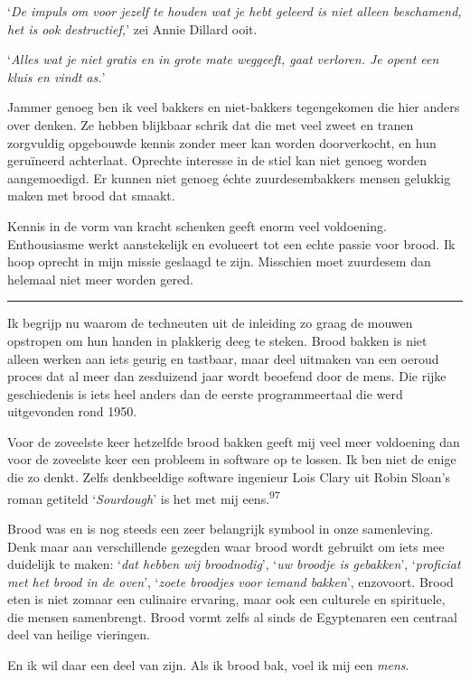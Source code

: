 \documentclass[
  11pt,
  dutch,
]{memoir}
\begin{document}
`\emph{De impuls om voor jezelf te houden wat je hebt geleerd is niet
alleen beschamend, het is ook destructief,}' zei Annie Dillard ooit.

`\emph{Alles wat je niet gratis en in grote mate weggeeft, gaat
verloren. Je opent een kluis en vindt as.}'

Jammer genoeg ben ik veel bakkers en niet-bakkers tegengekomen die hier
anders over denken. Ze hebben blijkbaar schrik dat die met veel zweet en
tranen zorgvuldig opgebouwde kennis zonder meer kan worden doorverkocht,
en hun geruïneerd achterlaat. Oprechte interesse in de stiel kan niet
genoeg worden aangemoedigd. Er kunnen niet genoeg échte zuurdesembakkers
mensen gelukkig maken met brood dat smaakt.

Kennis in de vorm van kracht schenken geeft enorm veel voldoening.
Enthousiasme werkt aanstekelijk en evolueert tot een echte passie voor
brood. Ik hoop oprecht in mijn missie geslaagd te zijn. Misschien moet
zuurdesem dan helemaal niet meer worden gered.

\pfbreak

Ik begrijp nu waarom de techneuten uit de inleiding zo graag de mouwen
opstropen om hun handen in plakkerig deeg te steken. Brood bakken is
niet alleen werken aan iets geurig en tastbaar, maar deel uitmaken van
een oeroud proces dat al meer dan zesduizend jaar wordt beoefend door de
mens. Die rijke geschiedenis is iets heel anders dan de eerste
programmeertaal die werd uitgevonden rond 1950.

Voor de zoveelste keer hetzelfde brood bakken geeft mij veel meer
voldoening dan voor de zoveelste keer een probleem in software op te
lossen. Ik ben niet de enige die zo denkt. Zelfs denkbeeldige software
ingenieur Lois Clary uit Robin Sloan's roman getiteld `\emph{Sourdough}'
is het met mij eens.\textsuperscript{97}

Brood was en is nog steeds een zeer belangrijk symbool in onze
samenleving. Denk maar aan verschillende gezegden waar brood wordt
gebruikt om iets mee duidelijk te maken: `\emph{dat hebben wij
broodnodig}', `\emph{uw broodje is gebakken}', `\emph{proficiat met het
brood in de oven}', `\emph{zoete broodjes voor iemand bakken}',
enzovoort. Brood eten is niet zomaar een culinaire ervaring, maar ook
een culturele en spirituele, die mensen samenbrengt. Brood vormt zelfs
al sinds de Egyptenaren een centraal deel van heilige vieringen.

En ik wil daar een deel van zijn. Als ik brood bak, voel ik mij een
\emph{mens}.
\end{document}
